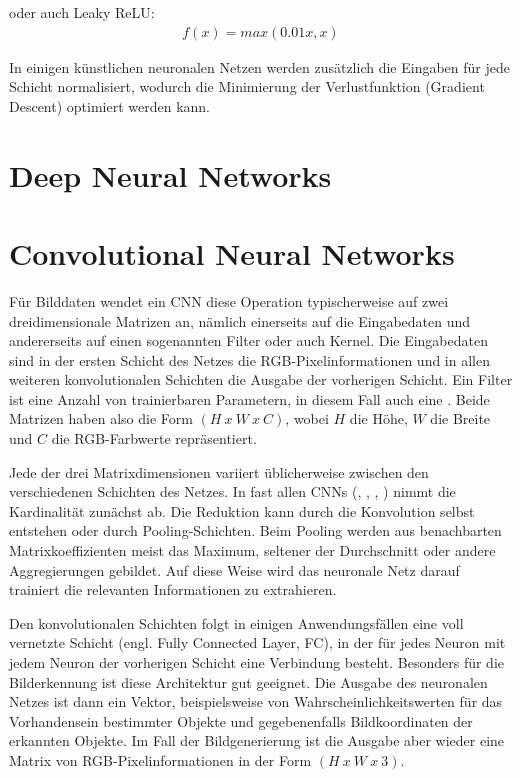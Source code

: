 oder auch Leaky ReLU:
\begin{align}
f(x) = max(0.01x, x)
\end{align}

In einigen künstlichen neuronalen Netzen werden zusätzlich die Eingaben für jede Schicht normalisiert, wodurch die Minimierung der Verlustfunktion (Gradient Descent) optimiert werden kann.

\section{Deep Neural Networks}
\label{sec:dnn}

\section{Convolutional Neural Networks}
\label{sec:cnn}
Für Bilddaten wendet ein CNN diese Operation typischerweise auf zwei dreidimensionale Matrizen an, nämlich einerseits auf die Eingabedaten und andererseits auf einen sogenannten Filter oder auch Kernel. Die Eingabedaten sind in der ersten Schicht des Netzes die RGB-Pixelinformationen und in allen weiteren konvolutionalen Schichten die Ausgabe der vorherigen Schicht. Ein Filter ist eine Anzahl von trainierbaren Parametern, in diesem Fall auch eine . Beide Matrizen haben also die Form $(H\ x\ W\ x\ C)$, wobei $H$ die Höhe, $W$ die Breite und $C$ die RGB-Farbwerte repräsentiert.

Jede der drei Matrixdimensionen variiert üblicherweise zwischen den verschiedenen Schichten des Netzes. In fast allen CNNs (\cite{Goodfellow-et-al-2016}, \cite{Lecun99objectrecognition}, \cite{RFB15a}, \cite{isola2018imagetoimage}) nimmt die Kardinalität zunächst ab. Die Reduktion kann durch die Konvolution selbst entstehen oder durch Pooling-Schichten. Beim Pooling werden aus benachbarten Matrixkoeffizienten meist das Maximum, seltener der Durchschnitt oder andere Aggregierungen gebildet. Auf diese Weise wird das neuronale Netz darauf trainiert die relevanten Informationen zu extrahieren. \cite{Goodfellow-et-al-2016}

Den konvolutionalen Schichten folgt in einigen Anwendungsfällen eine voll vernetzte Schicht (engl. Fully Connected Layer, FC), in der für jedes Neuron mit jedem Neuron der vorherigen Schicht eine Verbindung besteht. Besonders für die Bilderkennung ist diese Architektur gut geeignet. Die Ausgabe des neuronalen Netzes ist dann ein Vektor, beispielsweise von Wahrscheinlichkeitswerten für das Vorhandensein bestimmter Objekte und gegebenenfalls Bildkoordinaten der erkannten Objekte. Im Fall der Bildgenerierung ist die Ausgabe aber wieder eine Matrix von RGB-Pixelinformationen in der Form $(H\ x\ W\ x\ 3)$.

